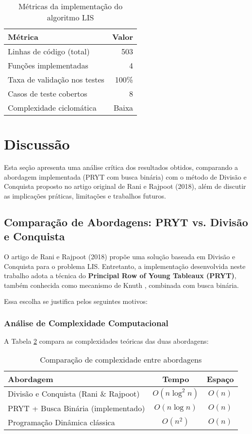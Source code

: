 \documentclass[por]{ajceam-class}
\begin{document}
\begin{table}[htbp]
\centering
\caption{Métricas da implementação do algoritmo LIS}
\label{tab:metricas}
\begin{tabular}{|l|r|}
\hline
\textbf{Métrica} & \textbf{Valor} \\
\hline
Linhas de código (total) & 503 \\
Funções implementadas & 4 \\
Taxa de validação nos testes & 100\% \\
Casos de teste cobertos & 8 \\
Complexidade ciclomática & Baixa \\
\hline
\end{tabular}
\end{table}


\section{Discussão}
\label{sec:discussao}

Esta seção apresenta uma análise crítica dos resultados obtidos, comparando a abordagem implementada (PRYT com busca binária) com o método de Divisão e Conquista proposto no artigo original de Rani e Rajpoot (2018), além de discutir as implicações práticas, limitações e trabalhos futuros.

\subsection{Comparação de Abordagens: PRYT vs. Divisão e Conquista}

O artigo de Rani e Rajpoot (2018) \cite{Rani2018} propõe uma solução baseada em Divisão e Conquista para o problema LIS. Entretanto, a implementação desenvolvida neste trabalho adota a técnica do \textbf{Principal Row of Young Tableaux (PRYT)}, também conhecida como mecanismo de Knuth \cite{Knuth1973}, combinada com busca binária.

Essa escolha se justifica pelos seguintes motivos:

\subsubsection{Análise de Complexidade Computacional}

A Tabela \ref{tab:comparacao_complexidade} compara as complexidades teóricas das duas abordagens:

\begin{table}[htbp]
\centering
\caption{Comparação de complexidade entre abordagens}
\label{tab:comparacao_complexidade}
\begin{tabular}{|l|c|c|}
\hline
\textbf{Abordagem} & \textbf{Tempo} & \textbf{Espaço} \\
\hline
Divisão e Conquista (Rani \& Rajpoot) & $O(n \log^2 n)$ & $O(n)$ \\
PRYT + Busca Binária (implementado) & $O(n \log n)$ & $O(n)$ \\
Programação Dinâmica clássica & $O(n^2)$ & $O(n)$ \\
\hline
\end{tabular}
\end{table}
\end{document}
